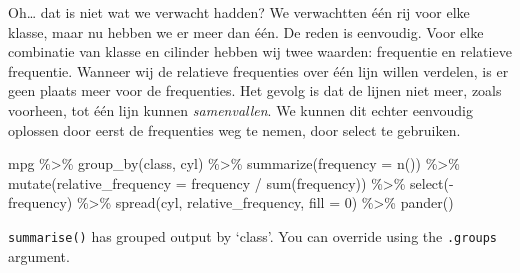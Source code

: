 \documentclass[]{tufte-book}
\newenvironment{Shaded}{}{}
\newcommand{\AttributeTok}[1]{\textcolor[rgb]{0.49,0.56,0.16}{#1}}
\newcommand{\DecValTok}[1]{\textcolor[rgb]{0.25,0.63,0.44}{#1}}
\newcommand{\FunctionTok}[1]{\textcolor[rgb]{0.02,0.16,0.49}{#1}}
\newcommand{\NormalTok}[1]{#1}
\newcommand{\SpecialCharTok}[1]{\textcolor[rgb]{0.25,0.44,0.63}{#1}}
\begin{document}
Oh\ldots{} dat is niet wat we verwacht hadden? We verwachtten één rij voor elke klasse, maar nu hebben we er meer dan één. De reden is eenvoudig. Voor elke combinatie van klasse en cilinder hebben wij twee waarden: frequentie en relatieve frequentie. Wanneer wij de relatieve frequenties over één lijn willen verdelen, is er geen plaats meer voor de frequenties. Het gevolg is dat de lijnen niet meer, zoals voorheen, tot één lijn kunnen \emph{samenvallen}. We kunnen dit echter eenvoudig oplossen door eerst de frequenties weg te nemen, door select te gebruiken.

\begin{Shaded}
\begin{Highlighting}[]
\NormalTok{mpg }\SpecialCharTok{\%\textgreater{}\%}
  \FunctionTok{group\_by}\NormalTok{(class, cyl) }\SpecialCharTok{\%\textgreater{}\%}
  \FunctionTok{summarize}\NormalTok{(}\AttributeTok{frequency =} \FunctionTok{n}\NormalTok{()) }\SpecialCharTok{\%\textgreater{}\%}
  \FunctionTok{mutate}\NormalTok{(}\AttributeTok{relative\_frequency =}\NormalTok{ frequency }\SpecialCharTok{/} \FunctionTok{sum}\NormalTok{(frequency)) }\SpecialCharTok{\%\textgreater{}\%}
  \FunctionTok{select}\NormalTok{(}\SpecialCharTok{{-}}\NormalTok{frequency) }\SpecialCharTok{\%\textgreater{}\%}
  \FunctionTok{spread}\NormalTok{(cyl, relative\_frequency, }\AttributeTok{fill =} \DecValTok{0}\NormalTok{) }\SpecialCharTok{\%\textgreater{}\%}
  \FunctionTok{pander}\NormalTok{()}
\end{Highlighting}
\end{Shaded}

\texttt{summarise()} has grouped output by `class'. You can override using the \texttt{.groups} argument.
\end{document}
